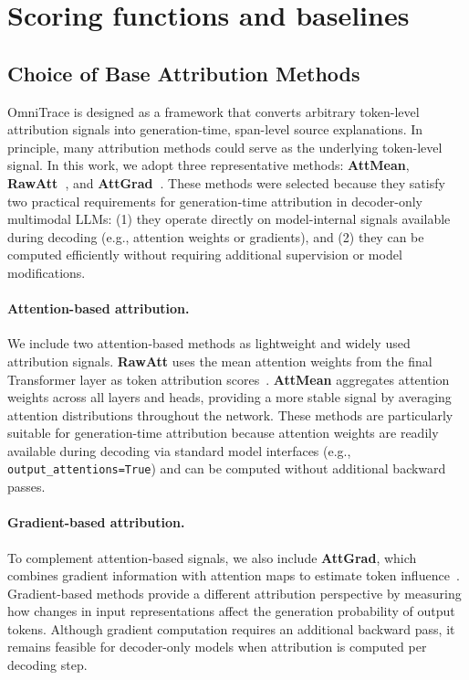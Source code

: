\section{Scoring functions and baselines}
\subsection{Choice of Base Attribution Methods}
\label{appendix:choice_scoring}
OmniTrace is designed as a framework that converts arbitrary token-level attribution signals into generation-time, span-level source explanations. In principle, many attribution methods could serve as the underlying token-level signal. In this work, we adopt three representative methods: \textbf{AttMean}, \textbf{RawAtt~\cite{abnar-zuidema-2020-quantifying}}, and \textbf{AttGrad~\cite{10.1145/3459637.3482126}}. These methods were selected because they satisfy two practical requirements for generation-time attribution in decoder-only multimodal LLMs: (1) they operate directly on model-internal signals available during decoding (e.g., attention weights or gradients), and (2) they can be computed efficiently without requiring additional supervision or model modifications.

\paragraph{Attention-based attribution.}
We include two attention-based methods as lightweight and widely used attribution signals. 
\textbf{RawAtt} uses the mean attention weights from the final Transformer layer as token attribution scores~\cite{abnar-zuidema-2020-quantifying}. 
\textbf{AttMean} aggregates attention weights across all layers and heads, providing a more stable signal by averaging attention distributions throughout the network. These methods are particularly suitable for generation-time attribution because attention weights are readily available during decoding via standard model interfaces (e.g., \texttt{output\_attentions=True}) and can be computed without additional backward passes.

\paragraph{Gradient-based attribution.}
To complement attention-based signals, we also include \textbf{AttGrad}, which combines gradient information with attention maps to estimate token influence~\cite{10.1145/3459637.3482126}. Gradient-based methods provide a different attribution perspective by measuring how changes in input representations affect the generation probability of output tokens. Although gradient computation requires an additional backward pass, it remains feasible for decoder-only models when attribution is computed per decoding step.

